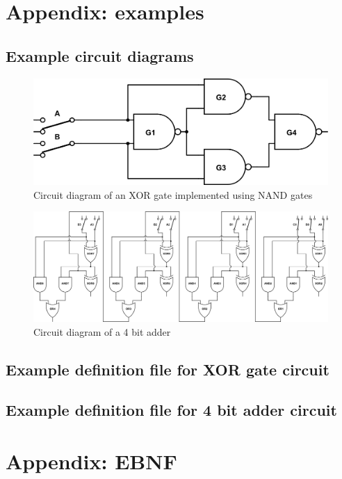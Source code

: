 \documentclass[a4paper,10pt]{article}
\begin{document}
\clearpage

\section{Appendix: examples}

\subsection{Example circuit diagrams}
\begin{figure}[h]
 \centering
 \includegraphics[width=14cm]{../examples/xor.png}
 \caption{Circuit diagram of an XOR gate implemented using NAND gates}
 \label{fig:example-xor}
\end{figure}

\begin{figure}[h]
 \centering
 \includegraphics[width=16cm]{../examples/4-bit-adder.png}
 \caption{Circuit diagram of a 4 bit adder}
 \label{fig:example-adder}
\end{figure}


\subsection{Example definition file for XOR gate circuit}


\subsection{Example definition file for 4 bit adder circuit}


\section{Appendix: EBNF}

\end{document}
